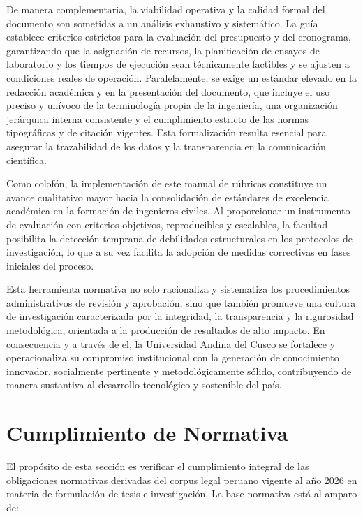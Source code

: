 De manera complementaria, la viabilidad operativa y la calidad formal del documento son sometidas a un análisis exhaustivo y sistemático. La guía establece criterios estrictos para la evaluación del presupuesto y del cronograma, garantizando que la asignación de recursos, la planificación de ensayos de laboratorio y los tiempos de ejecución sean técnicamente factibles y se ajusten a condiciones reales de operación. Paralelamente, se exige un estándar elevado en la redacción académica y en la presentación del documento, que incluye el uso preciso y unívoco de la terminología propia de la ingeniería, una organización jerárquica interna consistente y el cumplimiento estricto de las normas tipográficas y de citación vigentes. Esta formalización resulta esencial para asegurar la trazabilidad de los datos y la transparencia en la comunicación científica.

Como colofón, la implementación de este manual de rúbricas constituye un avance cualitativo mayor hacia la consolidación de estándares de excelencia académica en la formación de ingenieros civiles. Al proporcionar un instrumento de evaluación con criterios objetivos, reproducibles y escalables, la facultad posibilita la detección temprana de debilidades estructurales en los protocolos de investigación, lo que a su vez facilita la adopción de medidas correctivas en fases iniciales del proceso. 

Esta herramienta normativa no solo racionaliza y sistematiza los procedimientos administrativos de revisión y aprobación, sino que también promueve una cultura de investigación caracterizada por la integridad, la transparencia y la rigurosidad metodológica, orientada a la producción de resultados de alto impacto. En consecuencia y a través de el, la Universidad Andina del Cusco se fortalece y operacionaliza su compromiso institucional con la generación de conocimiento innovador, socialmente pertinente y metodológicamente sólido, contribuyendo de manera sustantiva al desarrollo tecnológico y sostenible del país.

\clearpage
\section{Cumplimiento de Normativa}

El propósito de esta sección es verificar el cumplimiento integral de las obligaciones normativas derivadas del corpus legal peruano vigente al año 2026 en materia de formulación de tesis e investigación. La base normativa está al amparo de:

